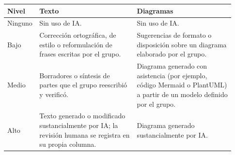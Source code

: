 \documentclass[11pt]{article}
\begin{document}
\begin{tabular}{@{}p{0.069\linewidth}p{0.429\linewidth}p{0.429\linewidth}@{}}
\toprule Nivel & Texto & Diagramas \\
\midrule
Ninguno & Sin uso de IA. & Sin uso de IA. \\
Bajo & Corrección ortográfica, de estilo o reformulación de frases escritas por el grupo. & Sugerencias de formato o disposición sobre un diagrama elaborado por el grupo. \\
Medio & Borradores o síntesis de partes que el grupo reescribió y verificó. & Diagrama generado con asistencia (por ejemplo, código Mermaid o PlantUML) a partir de un modelo definido por el grupo. \\
Alto & Texto generado o modificado sustancialmente por IA; la revisión humana se registra en su propia columna. & Diagrama generado sustancialmente por IA. \\
\bottomrule
\end{tabular}


\ossFinalPage
\end{document}
